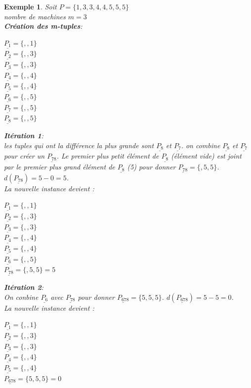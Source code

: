 \documentclass[a4paper,12pt]{report}
\theoremstyle{plain}				%
\newtheorem{example}{Exemple}
\theoremstyle{definition}				%
\begin{document}
\begin{itemize}
\begin{example}
Soit $P=\{1,3,3,4,4,5,5,5\}$\\
nombre de machines $m=3$\\
\textbf{Création des m-tuples}:\\
\begin{multicols}{3}
$\underline{P_{1}} = \{,,1\}$\\
$\underline{P_{2}} = \{,,3\}$\\
$\underline{P_{3}} = \{,,3\}$\\
$\underline{P_{4}} = \{,,4\}$\\
$\underline{P_{5}} = \{,,4\}$\\
$\underline{P_{6}} = \{,,5\}$\\
$\underline{P_{7}} = \{,,5\}$\\
$\underline{P_{8}} = \{,,5\}$\\
\end{multicols}

\textbf{Itération 1}:\\
les tuples qui ont la différence la plus grande sont 
$\underline{P_{8}}$  et $\underline{P_{7}}$. 
on combine $\underline{P_{8}}$  et $\underline{P_{7}}$ pour créer un $\underline{P_{78}}$. Le premier plus petit élément de $\underline{P_{8}}$ (élément vide) est joint par le premier plus grand élément de $\underline{P_{8}}$ (5) pour donner  $\underline{P_{78}} = \{,5,5\}$. $d(\underline{P_{78}}) = 5-0 = 5$.\\
La nouvelle instance devient :\\
\begin{multicols}{3}
$\underline{P_{1}} = \{,,1\}$\\
$\underline{P_{2}} = \{,,3\}$\\
$\underline{P_{3}} = \{,,3\}$\\
$\underline{P_{4}} = \{,,4\}$\\
$\underline{P_{5}} = \{,,4\}$\\
$\underline{P_{6}} = \{,,5\}$\\
$\underline{P_{78}} = \{,5,5\}=5$\\
\end{multicols}

\textbf{Itération 2}:\\
On conbine $\underline{P_{6}}$ avec $\underline{P_{78}}$ pour donner $\underline{P_{678}} = \{5,5,5\}$. $d(\underline{P_{678}}) = 5-5 = 0$.\\
La nouvelle instance devient :\\
\begin{multicols}{3}
$\underline{P_{1}} = \{,,1\}$\\
$\underline{P_{2}} = \{,,3\}$\\
$\underline{P_{3}} = \{,,3\}$\\
$\underline{P_{4}} = \{,,4\}$\\
$\underline{P_{5}} = \{,,4\}$\\
$\underline{P_{678}} = \{5,5,5\}=0$\\
\end{multicols}


\end{example}
\end{itemize}
\end{document}
